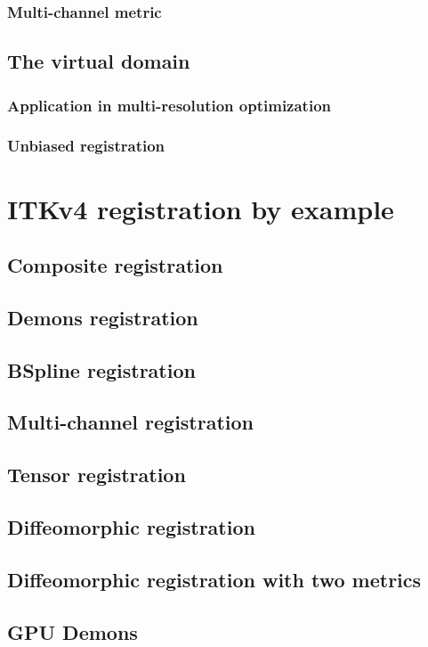 \documentclass{article}
\begin{document}
\subsubsection{Multi-channel metric}

\subsection{The virtual domain}
\subsubsection{Application in multi-resolution optimization}
\subsubsection{Unbiased registration}

\section{ITKv4 registration by example}

\subsection{Composite registration}
\subsection{Demons registration}
\subsection{BSpline registration}
\subsection{Multi-channel registration}
\subsection{Tensor registration}
\subsection{Diffeomorphic registration}
\subsection{Diffeomorphic registration with two metrics}
\subsection{GPU Demons}
\end{document}
